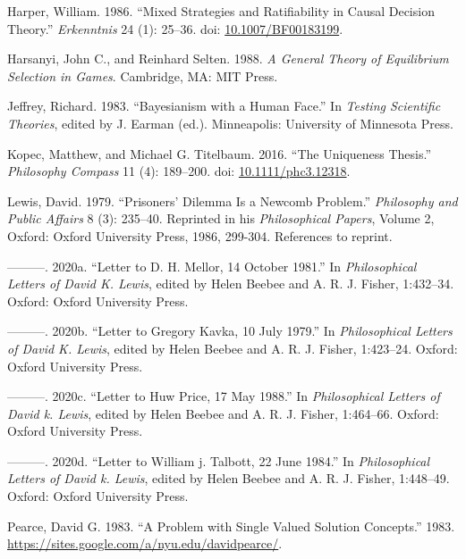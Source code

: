 \documentclass[
  10pt,
  letterpaper,
  DIV=11,
  numbers=noendperiod,
  twoside]{scrartcl}
\newlength{\cslhangindent}
\newenvironment{CSLReferences}[2] %
 {\begin{list}{}{%
  \setlength{\itemindent}{0pt}
  \setlength{\leftmargin}{0pt}
  \setlength{\parsep}{0pt}
  \ifodd #1
   \setlength{\leftmargin}{\cslhangindent}
   \setlength{\itemindent}{-1\cslhangindent}
  \fi
  \setlength{\itemsep}{#2\baselineskip}}}
 {\end{list}}
\begin{document}
\begin{CSLReferences}{1}{0}
Harper, William. 1986. {``Mixed Strategies and Ratifiability in Causal
Decision Theory.''} \emph{Erkenntnis} 24 (1): 25--36. doi:
\href{https://doi.org/10.1007/BF00183199}{10.1007/BF00183199}.

Harsanyi, John C., and Reinhard Selten. 1988. \emph{A General Theory of
Equilibrium Selection in Games}. Cambridge, MA: {MIT} Press.

Jeffrey, Richard. 1983. {``Bayesianism with a Human Face.''} In
\emph{Testing Scientific Theories}, edited by J. Earman (ed.).
Minneapolis: University of Minnesota Press.

Kopec, Matthew, and Michael G. Titelbaum. 2016. {``The Uniqueness
Thesis.''} \emph{Philosophy Compass} 11 (4): 189--200. doi:
\href{https://doi.org/10.1111/phc3.12318}{10.1111/phc3.12318}.

Lewis, David. 1979. {``Prisoners' Dilemma Is a {N}ewcomb Problem.''}
\emph{Philosophy and Public Affairs} 8 (3): 235--40. Reprinted in his
\emph{Philosophical Papers}, Volume 2, Oxford: Oxford University Press,
1986, 299-304. References to reprint.

---------. 2020a. {``Letter to {D}. H. Mellor, 14 October 1981.''} In
\emph{Philosophical Letters of David {K}. Lewis}, edited by Helen Beebee
and A. R. J. Fisher, 1:432--34. Oxford: Oxford University Press.

---------. 2020b. {``Letter to Gregory Kavka, 10 July 1979.''} In
\emph{Philosophical Letters of David {K}. Lewis}, edited by Helen Beebee
and A. R. J. Fisher, 1:423--24. Oxford: Oxford University Press.

---------. 2020c. {``Letter to Huw Price, 17 May 1988.''} In
\emph{Philosophical Letters of David k. Lewis}, edited by Helen Beebee
and A. R. J. Fisher, 1:464--66. Oxford: Oxford University Press.

---------. 2020d. {``Letter to William j. Talbott, 22 June 1984.''} In
\emph{Philosophical Letters of David k. Lewis}, edited by Helen Beebee
and A. R. J. Fisher, 1:448--49. Oxford: Oxford University Press.

Pearce, David G. 1983. {``A Problem with Single Valued Solution
Concepts.''} 1983.
\url{https://sites.google.com/a/nyu.edu/davidpearce/}.


\end{CSLReferences}
\end{document}

